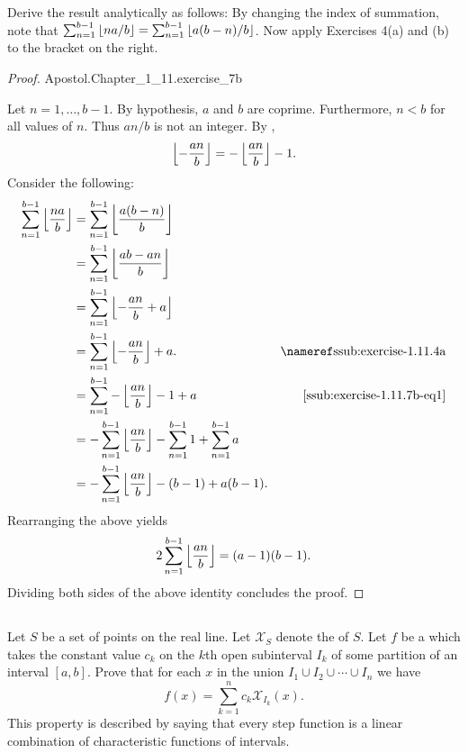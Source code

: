 \documentclass{report}
\begin{document}
Derive the result analytically as follows:
By changing the index of summation, note that
  $\sum_{n=1}^{b-1} \left\lfloor na / b\right\rfloor = \sum_{n=1}^{b-1} \left\lfloor a(b - n) / b\right\rfloor$.
Now apply Exercises 4(a) and (b) to the bracket on the right.

\begin{proof}

    {Apostol.Chapter\_1\_11.exercise\_7b}

  Let $n = 1, \ldots, b - 1$.
  By hypothesis, $a$ and $b$ are coprime.
  Furthermore, $n < b$ for all values of $n$.
  Thus $an / b$ is not an integer.
  By ,
    \begin{equation}
      \label{ssub:exercise-1.11.7b-eq1}
      \left\lfloor-\frac{an}{b}\right\rfloor = -\left\lfloor\frac{an}{b}\right\rfloor - 1.
    \end{equation}
  Consider the following:
    \begin{align*}
      \sum_{n=1}^{b-1} \floor{\frac{na}{b}}
        & = \sum_{n=1}^{b-1} \floor{\frac{a(b - n)}{b}} \\
        & = \sum_{n=1}^{b-1} \floor{\frac{ab - an}{b}} \\
        & = \sum_{n=1}^{b-1} \floor{-\frac{an}{b} + a} \\
        & = \sum_{n=1}^{b-1} \floor{-\frac{an}{b}} + a.
          & \textref{ssub:exercise-1.11.4a} \\
        & = \sum_{n=1}^{b-1} -\floor{\frac{an}{b}} - 1 + a
          & \eqref{ssub:exercise-1.11.7b-eq1} \\
        & = -\sum_{n=1}^{b-1} \floor{\frac{an}{b}} - \sum_{n=1}^{b-1} 1 +
          \sum_{n=1}^{b-1} a \\
        & = -\sum_{n=1}^{b-1} \floor{\frac{an}{b}} - (b - 1) + a(b - 1).
    \end{align*}
  Rearranging the above yields
    $$2\sum_{n=1}^{b-1} \left\lfloor\frac{an}{b}\right\rfloor = (a - 1)(b - 1).$$
  Dividing both sides of the above identity concludes the proof.

\end{proof}

\subsection{}%
\label{sub:exercise-1.11.8}

Let $S$ be a set of points on the real line.
Let $\mathcal{X}_S$ denote the  of $S$.
Let $f$ be a  which takes the constant value
  $c_k$ on the $k$th open subinterval $I_k$ of some partition of an interval
  $[a, b]$.
Prove that for each $x$ in the union $I_1 \cup I_2 \cup \cdots \cup I_n$ we have
  $$f(x) = \sum_{k=1}^n c_k\mathcal{X}_{I_k}(x).$$
This property is described by saying that every step function is a linear
  combination of characteristic functions of intervals.
\end{document}
